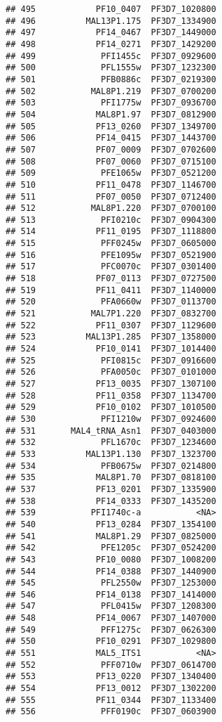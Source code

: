 \documentclass{article}\usepackage[]{graphicx}\usepackage[]{color}
\makeatletter
\newenvironment{kframe}{%
 \def\at@end@of@kframe{}%
 \ifinner\ifhmode%
  \def\at@end@of@kframe{\end{minipage}}%
  \begin{minipage}{\columnwidth}%
 \fi\fi%
 \def\FrameCommand##1{\hskip\@totalleftmargin \hskip-\fboxsep
 \colorbox{shadecolor}{##1}\hskip-\fboxsep
     \hskip-\linewidth \hskip-\@totalleftmargin \hskip\columnwidth}%
 \MakeFramed {\advance\hsize-\width
   \@totalleftmargin\z@ \linewidth\hsize
   \@setminipage}}%
 {\par\unskip\endMakeFramed%
 \at@end@of@kframe}
\newenvironment{knitrout}{}{} %
\makeatother
\begin{document}
\begin{knitrout}
\begin{kframe}
\begin{verbatim}
## 495            PF10_0407  PF3D7_1020800
## 496          MAL13P1.175  PF3D7_1334900
## 497            PF14_0467  PF3D7_1449000
## 498            PF14_0271  PF3D7_1429200
## 499             PFI1455c  PF3D7_0929600
## 500             PFL1555w  PF3D7_1232300
## 501             PFB0886c  PF3D7_0219300
## 502           MAL8P1.219  PF3D7_0700200
## 503             PFI1775w  PF3D7_0936700
## 504            MAL8P1.97  PF3D7_0812900
## 505            PF13_0260  PF3D7_1349700
## 506            PF14_0415  PF3D7_1443700
## 507            PF07_0009  PF3D7_0702600
## 508            PF07_0060  PF3D7_0715100
## 509             PFE1065w  PF3D7_0521200
## 510            PF11_0478  PF3D7_1146700
## 511            PF07_0050  PF3D7_0712400
## 512           MAL8P1.220  PF3D7_0700100
## 513             PFI0210c  PF3D7_0904300
## 514            PF11_0195  PF3D7_1118800
## 515             PFF0245w  PF3D7_0605000
## 516             PFE1095w  PF3D7_0521900
## 517             PFC0070c  PF3D7_0301400
## 518            PF07_0113  PF3D7_0727500
## 519            PF11_0411  PF3D7_1140000
## 520             PFA0660w  PF3D7_0113700
## 521           MAL7P1.220  PF3D7_0832700
## 522            PF11_0307  PF3D7_1129600
## 523          MAL13P1.285  PF3D7_1358000
## 524            PF10_0141  PF3D7_1014400
## 525             PFI0815c  PF3D7_0916600
## 526             PFA0050c  PF3D7_0101000
## 527            PF13_0035  PF3D7_1307100
## 528            PF11_0358  PF3D7_1134700
## 529            PF10_0102  PF3D7_1010500
## 530             PFI1210w  PF3D7_0924600
## 531       MAL4_tRNA_Asn1  PF3D7_0403000
## 532             PFL1670c  PF3D7_1234600
## 533          MAL13P1.130  PF3D7_1323700
## 534             PFB0675w  PF3D7_0214800
## 535            MAL8P1.70  PF3D7_0818100
## 537            PF13_0201  PF3D7_1335900
## 538            PF14_0333  PF3D7_1435200
## 539           PFI1740c-a           <NA>
## 540            PF13_0284  PF3D7_1354100
## 541            MAL8P1.29  PF3D7_0825000
## 542             PFE1205c  PF3D7_0524200
## 543            PF10_0080  PF3D7_1008200
## 544            PF14_0388  PF3D7_1440900
## 545             PFL2550w  PF3D7_1253000
## 546            PF14_0138  PF3D7_1414000
## 547             PFL0415w  PF3D7_1208300
## 548            PF14_0067  PF3D7_1407000
## 549             PFF1275c  PF3D7_0626300
## 550            PF10_0291  PF3D7_1029800
## 551            MAL5_ITS1           <NA>
## 552             PFF0710w  PF3D7_0614700
## 553            PF13_0220  PF3D7_1340400
## 554            PF13_0012  PF3D7_1302200
## 555            PF11_0344  PF3D7_1133400
## 556             PFF0190c  PF3D7_0603900

\end{verbatim}
\end{kframe}
\end{knitrout}
\end{document}
